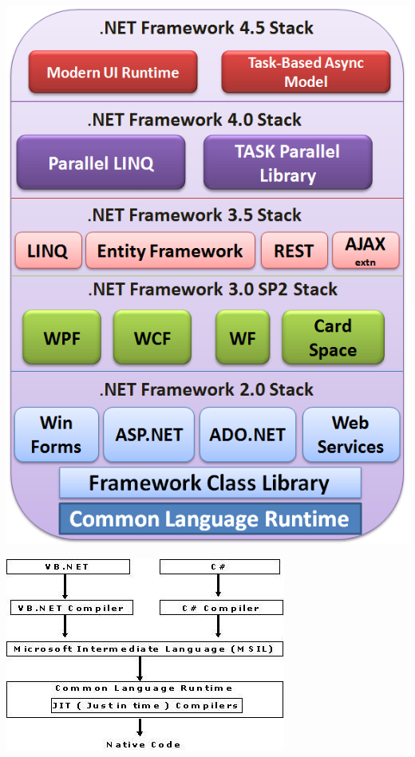 \begin{frame}[fragile]
\begin{center}
\includegraphics[height=\textheight]{img/dotnet_framework_stack.png}
\end{center}
\end{frame}

\begin{frame}[fragile]
\begin{center}
\includegraphics[width=\textwidth]{img/msil_code.jpg}
\end{center}
\end{frame}



